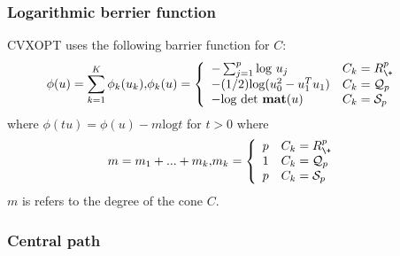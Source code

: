 \subsubsection*{Logarithmic berrier function}
CVXOPT uses the following barrier function for $C$:
\begin{equation*}
	\begin{aligned}
		\phi(u)=\sum_{k=1}^{K}\phi_k(u_k), & \phi_k(u)=
		\left\{
                \begin{array}{ll}
                  -\sum_{j=1}^{p} \text{log } u_j & C_k=R_{\+}^p \\
                  -(1/2)\text{log}(u_0^2-u_1^T u_1) & C_k=\mathcal{Q}_p \\
                  -\text{log det \textbf{mat}}(u) & C_k = \mathcal{S}_p
                \end{array}
              \right.
	\end{aligned}
\end{equation*}
where $\phi(tu) = \phi(u) - m\text{log}t$ for $t>0$ where
\begin{equation*}
	\begin{aligned}
		m = m_1+...+m_k, & m_k=
		\left\{
                \begin{array}{ll}
                  p & C_k=R_{\+}^p \\
                  1 & C_k=\mathcal{Q}_p \\
                  p & C_k = \mathcal{S}_p
                \end{array}
              \right.
	\end{aligned}
\end{equation*}
$m$ is refers to the degree of the cone $C$.

\subsubsection*{Central path}

